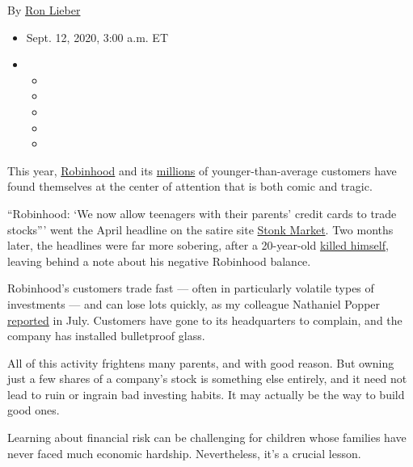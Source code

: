 By \href{https://www.nytimes3xbfgragh.onion/by/ron-lieber}{Ron Lieber}

\begin{itemize}
\item
  Sept. 12, 2020, 3:00 a.m. ET
\item
  \begin{itemize}
  \item
  \item
  \item
  \item
  \item
  \end{itemize}
\end{itemize}

This year,
\href{https://www.nytimes3xbfgragh.onion/2020/06/14/business/sports-gamblers-stocks-virus.html}{Robinhood}
and its
\href{https://www.nytimes3xbfgragh.onion/2020/06/14/business/sports-gamblers-stocks-virus.html}{millions}
of younger-than-average customers have found themselves at the center of
attention that is both comic and tragic.

``Robinhood: `We now allow teenagers with their parents' credit cards to
trade stocks''' went the April headline on the satire site
\href{https://thestonkmarket.com/robinhood-we-now-allow-teenagers-with-their-parents-credit-cards-to-trade-stocks/}{Stonk
Market}. Two months later, the headlines were far more sobering, after a
20-year-old
\href{https://www.forbes.com/sites/sergeiklebnikov/2020/06/17/20-year-old-robinhood-customer-dies-by-suicide-after-seeing-a-730000-negative-balance/\#46e6932c1638}{killed
himself}, leaving behind a note about his negative Robinhood balance.

Robinhood's customers trade fast --- often in particularly volatile
types of investments --- and can lose lots quickly, as my colleague
Nathaniel Popper
\href{https://www.nytimes3xbfgragh.onion/2020/07/08/technology/robinhood-risky-trading.html}{reported}
in July. Customers have gone to its headquarters to complain, and the
company has installed bulletproof glass.

All of this activity frightens many parents, and with good reason. But
owning just a few shares of a company's stock is something else
entirely, and it need not lead to ruin or ingrain bad investing habits.
It may actually be the way to build good ones.

Learning about financial risk can be challenging for children whose
families have never faced much economic hardship. Nevertheless, it's a
crucial lesson.

